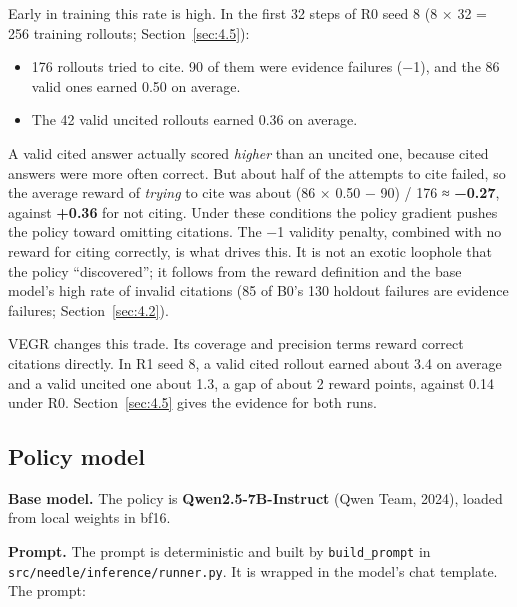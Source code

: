 Early in training this rate is high. In the first 32 steps of R0 seed 8
(8 × 32 = 256 training rollouts; Section~\ref{sec:4.5}):

\begin{itemize}
\tightlist
\item
  176 rollouts tried to cite. 90 of them were evidence failures (−1),
  and the 86 valid ones earned 0.50 on average.
\item
  The 42 valid uncited rollouts earned 0.36 on average.
\end{itemize}

A valid cited answer actually scored \emph{higher} than an uncited one,
because cited answers were more often correct. But about half of the
attempts to cite failed, so the average reward of \emph{trying} to cite
was about (86 × 0.50 − 90) / 176 ≈ \textbf{−0.27}, against
\textbf{+0.36} for not citing. Under these conditions the policy
gradient pushes the policy toward omitting citations. The −1 validity
penalty, combined with no reward for citing correctly, is what drives
this. It is not an exotic loophole that the policy ``discovered''; it
follows from the reward definition and the base model's high rate of
invalid citations (85 of B0's 130 holdout failures are evidence
failures; Section~\ref{sec:4.2}).

VEGR changes this trade. Its coverage and precision terms reward correct
citations directly. In R1 seed 8, a valid cited rollout earned about 3.4
on average and a valid uncited one about 1.3, a gap of about 2 reward
points, against 0.14 under R0. Section~\ref{sec:4.5} gives the evidence
for both runs.

\subsection{Policy model}\label{sec:3.5}

\textbf{Base model.} The policy is \textbf{Qwen2.5-7B-Instruct} (Qwen
Team, 2024), loaded from local weights in bf16.

\textbf{Prompt.} The prompt is deterministic and built by
\texttt{build\_\allowbreak{}prompt} in
\texttt{src/\allowbreak{}needle/\allowbreak{}inference/\allowbreak{}runner.\allowbreak{}py}.
It is wrapped in the model's chat template. The prompt:


